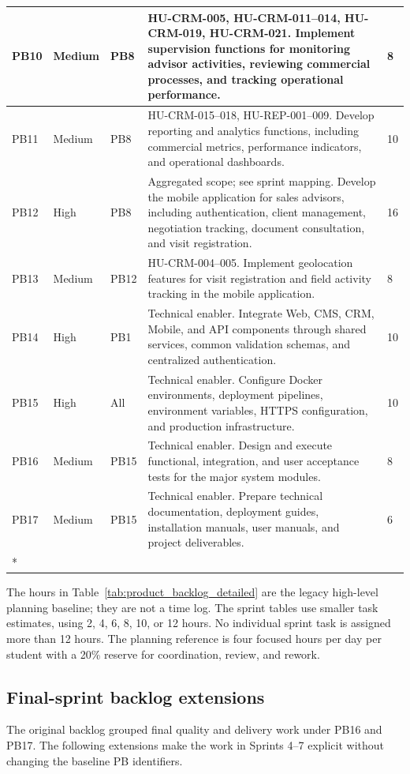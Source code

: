 \documentclass[letterpaper%
, oneside%
, 12pt%
, memoireprojet%
, english%
,creativecommons,hyperref, withAlgo2e %
]{thETS}
\newcommand{\tablelastrow}{%
    \\* \hline
}
\begin{document}
\begin{longtable}{|L{1.0cm}|L{1.3cm}|L{2.4cm}|L{8.4cm}|L{1.8cm}|}
\hline
PB10 & Medium & PB8 & HU-CRM-005, HU-CRM-011--014, HU-CRM-019, HU-CRM-021. Implement supervision functions for monitoring advisor activities, reviewing commercial processes, and tracking operational performance. & 8 \\
\hline
PB11 & Medium & PB8 & HU-CRM-015--018, HU-REP-001--009. Develop reporting and analytics functions, including commercial metrics, performance indicators, and operational dashboards. & 10 \\
\hline
PB12 & High & PB8 & Aggregated scope; see sprint mapping. Develop the mobile application for sales advisors, including authentication, client management, negotiation tracking, document consultation, and visit registration. & 16 \\
\hline
PB13 & Medium & PB12 & HU-CRM-004--005. Implement geolocation features for visit registration and field activity tracking in the mobile application. & 8 \\
\hline
PB14 & High & PB1 & Technical enabler. Integrate Web, CMS, CRM, Mobile, and API components through shared services, common validation schemas, and centralized authentication. & 10 \\
\hline
PB15 & High & All & Technical enabler. Configure Docker environments, deployment pipelines, environment variables, HTTPS configuration, and production infrastructure. & 10 \\
\hline
PB16 & Medium & PB15 & Technical enabler. Design and execute functional, integration, and user acceptance tests for the major system modules. & 8 \\
\hline
PB17 & Medium & PB15 & Technical enabler. Prepare technical documentation, deployment guides, installation manuals, user manuals, and project deliverables. & 6 \tablelastrow
\end{longtable}

The hours in Table~\ref{tab:product_backlog_detailed} are the legacy high-level planning
baseline; they are not a time log. The sprint tables use smaller task estimates, using 2, 4, 6, 8,
10, or 12 hours. No individual sprint task is assigned more than 12 hours. The planning reference
is four focused hours per day per student with a 20\% reserve for coordination, review, and rework.

\subsection{Final-sprint backlog extensions}
The original backlog grouped final quality and delivery work under PB16 and PB17. The following
extensions make the work in Sprints 4--7 explicit without changing the baseline PB
identifiers.
\end{document}
